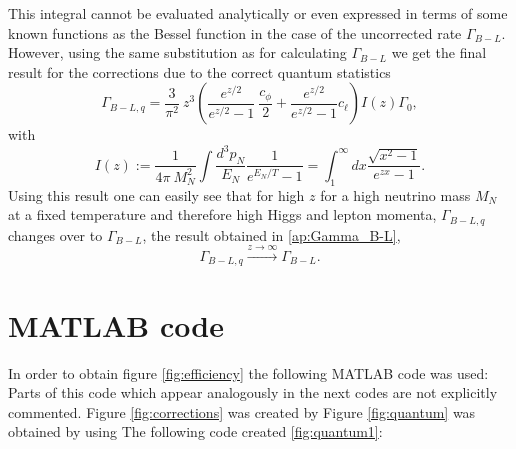 This integral cannot be evaluated analytically or even expressed in terms of some known functions as the Bessel function in the case of the uncorrected rate $\Gamma_{B-L}$. However, using the same substitution as for calculating $\Gamma_{B-L}$ we get the final result for the corrections due to the correct quantum statistics
\begin{equation*}
	\Gamma_{B-L,q}=\frac{3}{\pi^2}\:z^3\left(\frac{e^{z/2}}{e^{z/2}-1}\:\frac{c_\phi}{2}+\frac{e^{z/2}}{e^{z/2}-1}c_\ell\right)I(z)\Gamma_0,
\end{equation*}
with 
\begin{equation*}
	I(z):=\frac{1}{4\pi\: M_N^2}\int \frac{d^3p_N}{E_N}\frac{1}{e^{E_N/T}-1}=\int_{1}^{\infty}dx\frac{\sqrt{x^2-1}}{e^{zx}-1}.
\end{equation*}
Using this result one can easily see that for high $z$ for a high neutrino mass $M_N$ at a fixed temperature and therefore high Higgs and lepton momenta, $\Gamma_{B-L,q}$ changes over to $\Gamma_{B-L}$, the result obtained in \ref{ap:Gamma_B-L},
\begin{equation*}
	\Gamma_{B-L,q}\overset{z\rightarrow\infty}{\longrightarrow}\Gamma_{B-L}.
\end{equation*}
\newpage
\section{MATLAB code}
\label{ap:matlab}
In order to obtain figure \ref{fig:efficiency} the following MATLAB code was used:
 Parts of this code which appear analogously in the next codes are not explicitly commented.
\noindent
Figure \ref{fig:corrections} was created by
\newpage\noindent
Figure \ref{fig:quantum} was obtained by using
\newpage\noindent
The following code created \ref{fig:quantum1}:


